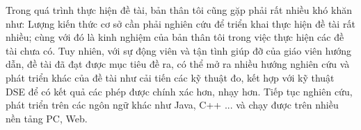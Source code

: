 Trong quá trình thực hiện đề tài, bản thân tôi cũng gặp phải rất nhiều
khó khăn như: Lượng kiến thức cơ sở cần phải nghiên cứu để triển khai
thực hiện đề tài rất nhiều; cùng với đó là kinh nghiệm của bản thân
tôi trong việc thực hiện các đề tài chưa có. Tuy nhiên, với sự động
viên và tận tình giúp đỡ của giáo viên hướng dẫn, đề tài đã đạt được
mục tiêu đề ra, có thể mở ra nhiều hướng nghiên cứu và phát triển khác
của đề tài như cải tiến các kỹ thuật đo, kết hợp với kỹ thuật DSE để
có kết quả các phép được chính xác hơn, nhạy hơn. Tiếp tục nghiên cứu,
phát triển trên các ngôn ngữ khác như Java, C++ ... và chạy được trên
nhiều nền tảng PC, Web.

